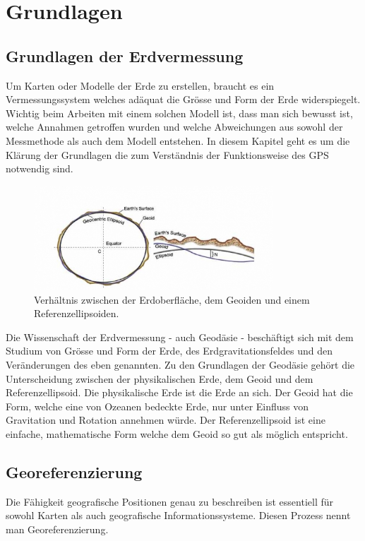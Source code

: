 \clearpage
\section{Grundlagen}
\subsection{Grundlagen der Erdvermessung}
Um Karten oder Modelle der Erde zu erstellen, braucht es ein Vermessungssystem welches adäquat die Grösse und Form der Erde widerspiegelt. Wichtig beim Arbeiten mit einem solchen Modell ist, dass man sich bewusst ist, welche Annahmen getroffen wurden und welche Abweichungen aus sowohl der Messmethode als auch dem Modell entstehen. In diesem Kapitel geht es um die Klärung der Grundlagen die zum Verständnis der Funktionsweise des GPS notwendig sind. \cite{geodesy}

\begin{figure}[h]
  \centering
  \includegraphics[width=0.8\textwidth]{images/geoid.jpg}
  \caption[Erde, Geoid und Referenzellipsoid]{Verhältnis zwischen der Erdoberfläche, dem Geoiden und einem Referenzellipsoiden. \cite{geodesy}}
  \label{fig:geoid}
\end{figure}

Die Wissenschaft der Erdvermessung - auch Geodäsie - beschäftigt sich mit dem Studium von Grösse und Form der Erde, des Erdgravitationsfeldes und den Veränderungen des eben genannten. Zu den Grundlagen der Geodäsie gehört die Unterscheidung zwischen der physikalischen Erde, dem Geoid und dem Referenzellipsoid. Die physikalische Erde ist die Erde an sich. Der Geoid hat die Form, welche eine von Ozeanen bedeckte Erde, nur unter Einfluss von Gravitation und Rotation annehmen würde. Der Referenzellipsoid ist eine einfache, mathematische Form welche dem Geoid so gut als möglich entspricht. \cite{geodesy}

\subsection{Georeferenzierung}
Die Fähigkeit geografische Positionen genau zu beschreiben ist essentiell für sowohl Karten als auch geografische Informationssysteme. Diesen Prozess nennt man Georeferenzierung.

